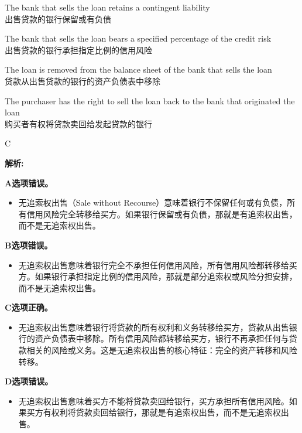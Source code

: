 \documentclass{article}
\newenvironment{explanation}
{\textbf{解析:}\par}
{\par}
\begin{document}
\begin{choices}
    \item The bank that sells the loan retains a contingent liability\\
    出售贷款的银行保留或有负债
    \item The bank that sells the loan bears a specified percentage of the credit risk\\
    出售贷款的银行承担指定比例的信用风险
    \item The loan is removed from the balance sheet of the bank that sells the loan\\
    贷款从出售贷款的银行的资产负债表中移除
    \item The purchaser has the right to sell the loan back to the bank that originated the loan\\
    购买者有权将贷款卖回给发起贷款的银行
\end{choices}

\begin{correctanswer}
    C
\end{correctanswer}

\begin{explanation}
    \textbf{A选项错误。}
    \begin{itemize}
        \item 无追索权出售（Sale without Recourse）意味着银行不保留任何或有负债，所有信用风险完全转移给买方。如果银行保留或有负债，那就是有追索权出售，而不是无追索权出售。
    \end{itemize}

    \textbf{B选项错误。}
    \begin{itemize}
        \item 无追索权出售意味着银行完全不承担任何信用风险，所有信用风险都转移给买方。如果银行承担指定比例的信用风险，那就是部分追索权或风险分担安排，而不是无追索权出售。
    \end{itemize}

    \textbf{C选项正确。}
    \begin{itemize}
        \item 无追索权出售意味着银行将贷款的所有权利和义务转移给买方，贷款从出售银行的资产负债表中移除。所有信用风险都转移给买方，银行不再承担任何与贷款相关的风险或义务。这是无追索权出售的核心特征：完全的资产转移和风险转移。
    \end{itemize}

    \textbf{D选项错误。}
    \begin{itemize}
        \item 无追索权出售意味着买方不能将贷款卖回给银行，买方承担所有信用风险。如果买方有权利将贷款卖回给银行，那就是有追索权出售，而不是无追索权出售。
    \end{itemize}
\end{explanation}
\end{document}
